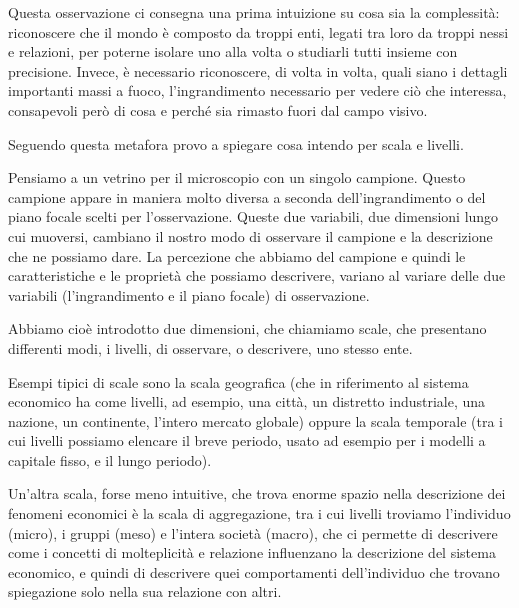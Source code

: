\documentclass[a4paper, headings=standardclasses]{scrartcl}
\begin{document}
Questa osservazione ci consegna una prima intuizione su cosa sia la complessità: riconoscere che il mondo è composto da troppi enti, legati tra loro da troppi nessi e relazioni, per poterne isolare uno alla volta o studiarli tutti insieme con precisione. Invece, è necessario riconoscere, di volta in volta, quali siano i dettagli importanti massi a fuoco, l'ingrandimento necessario per vedere ciò che interessa, consapevoli però di cosa e perché sia rimasto fuori dal campo visivo.

Seguendo questa metafora provo a spiegare cosa intendo per scala e livelli.

Pensiamo a un vetrino per il microscopio con un singolo campione. Questo campione appare
in maniera molto diversa a seconda dell'ingrandimento o del piano focale scelti per l'osservazione.
Queste due variabili, due dimensioni lungo cui muoversi, cambiano il nostro modo di osservare il campione e la descrizione che ne possiamo dare.
La percezione che abbiamo del campione e quindi le caratteristiche e le proprietà che possiamo
descrivere, variano al variare delle due variabili (l'ingrandimento e il piano focale) di osservazione.

Abbiamo cioè introdotto due dimensioni, che chiamiamo scale, che presentano differenti modi, i livelli, di osservare, o descrivere, uno stesso ente.

Esempi tipici di scale sono la scala geografica (che in riferimento al sistema economico ha come livelli, ad esempio, una città, un distretto industriale, una nazione, un continente, l'intero
mercato globale) oppure la scala temporale (tra i cui livelli possiamo elencare il breve periodo, usato ad esempio per i modelli a capitale fisso, e il lungo periodo).

Un'altra scala, forse meno intuitive, che trova enorme spazio nella descrizione dei fenomeni economici è la scala di aggregazione, tra i cui livelli troviamo l'individuo (micro), i gruppi (meso) e l'intera società (macro), che ci permette di descrivere come i concetti di molteplicità e relazione influenzano la descrizione del sistema economico, e quindi di descrivere quei comportamenti dell'individuo che trovano spiegazione solo nella sua relazione con altri. 
\end{document}
